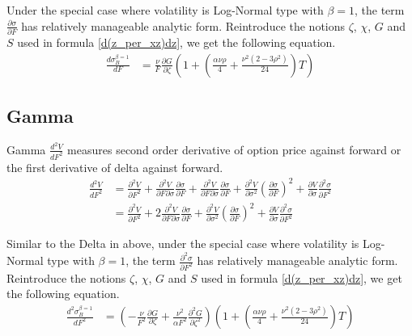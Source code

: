 \documentclass{article}
\begin{document}
Under the special case where volatility is Log-Normal type with $ \beta = 1 $, the term $ \frac{\partial \sigma}{\partial F} $ has relatively manageable analytic form. Reintroduce the notions $ \zeta $, $ \chi $, $ G $ and $ S $ used in formula \ref{d(z_per_xz)dz}, we get the following equation.
\begin{align}
    \frac{d \sigma_{B}^{\beta = 1}}{d F} &= \frac{\nu}{F} \frac{\partial G}{\partial \zeta} \left(1 + \left(\frac{\alpha \nu \rho}{4} + \frac{\nu^2 \left(2 - 3 \rho^2\right)}{24}\right) T \right)
\end{align}

\subsection{Gamma}
Gamma $ \frac{d^2 V}{d F^2} $ measures second order derivative of option price against forward or the first derivative of delta against forward.
\begin{align}
    \frac{d^2 V}{d F^2} &= \frac{\partial^2 V}{\partial F^2} + \frac{\partial^2 V}{\partial F \partial \sigma} \frac{\partial \sigma}{\partial F} + \frac{\partial^2 V}{\partial F \partial \sigma} \frac{\partial \sigma}{\partial F} + \frac{\partial^2 V}{\partial \sigma^2} \left(\frac{\partial \sigma}{\partial F}\right)^2 + \frac{\partial V}{\partial \sigma} \frac{\partial^2 \sigma}{\partial F^2} \nonumber \\
    &= \frac{\partial^2 V}{\partial F^2} + 2 \frac{\partial^2 V}{\partial F \partial \sigma} \frac{\partial \sigma}{\partial F} + \frac{\partial^2 V}{\partial \sigma^2} \left(\frac{\partial \sigma}{\partial F}\right)^2 + \frac{\partial V}{\partial \sigma} \frac{\partial^2 \sigma}{\partial F^2}
\end{align}

Similar to the Delta in above, under the special case where volatility is Log-Normal type with $ \beta = 1 $, the term $ \frac{\partial^2 \sigma}{\partial F^2} $ has relatively manageable analytic form. Reintroduce the notions $ \zeta $, $ \chi $, $ G $ and $ S $ used in formula \ref{d(z_per_xz)dz}, we get the following equation.
\begin{align}
    \frac{d^2 \sigma_{B}^{\beta = 1}}{d F^2} &= \left(-\frac{\nu}{F^2} \frac{\partial G}{\partial \zeta} + \frac{\nu^2}{\alpha F^2} \frac{\partial^2 G}{\partial \zeta^2}\right) \left(1 + \left(\frac{\alpha \nu \rho}{4} + \frac{\nu^2 \left(2 - 3 \rho^2\right)}{24}\right) T\right)
\end{align}
\end{document}
